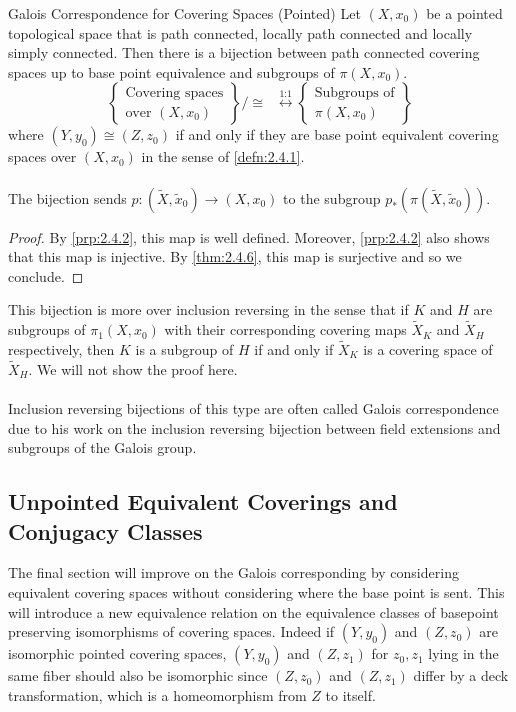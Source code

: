 \documentclass[a4paper]{article}
\begin{document}
\begin{thm}{Galois Correspondence for Covering Spaces (Pointed)}{} Let $(X,x_0)$ be a pointed topological space that is path connected, locally path connected and locally simply connected. Then there is a bijection between path connected covering spaces up to base point equivalence and subgroups of $\pi(X,x_0)$. $$\left\{\substack{\text{Covering spaces}\\\text{over }(X,x_0)}\right\}/\cong\;\;\overset{\text{1:1}}{\longleftrightarrow}\left\{\substack{\text{Subgroups of}\\ \pi(X,x_0)}\right\}$$ where $(Y,y_0)\cong(Z,z_0)$ if and only if they are base point equivalent covering spaces over $(X,x_0)$ in the sense of \ref{defn:2.4.1}. \\~\\

The bijection sends $p:(\tilde{X},\tilde{x}_0)\to(X,x_0)$ to the subgroup $p_\ast(\pi(\tilde{X},\tilde{x}_0))$. \tcbline
\begin{proof}
By \ref{prp:2.4.2}, this map is well defined. Moreover, \ref{prp:2.4.2} also shows that this map is injective. By \ref{thm:2.4.6}, this map is surjective and so we conclude. 
\end{proof}
\end{thm}

This bijection is more over inclusion reversing in the sense that if $K$ and $H$ are subgroups of $\pi_1(X,x_0)$ with their corresponding covering maps $\tilde{X}_K$ and $\tilde{X}_H$ respectively, then $K$ is a subgroup of $H$ if and only if $\tilde{X}_K$ is a covering space of $\tilde{X}_H$. We will not show the proof here. \\~\\

Inclusion reversing bijections of this type are often called Galois correspondence due to his work on the inclusion reversing bijection between field extensions and subgroups of the Galois group. 

\subsection{Unpointed Equivalent Coverings and Conjugacy Classes}
The final section will improve on the Galois corresponding by considering equivalent covering spaces without considering where the base point is sent. This will introduce a new equivalence relation on the equivalence classes of basepoint preserving isomorphisms of covering spaces. Indeed if $(Y,y_0)$ and $(Z,z_0)$ are isomorphic pointed covering spaces, $(Y,y_0)$ and $(Z,z_1)$ for $z_0,z_1$ lying in the same fiber should also be isomorphic since $(Z,z_0)$ and $(Z,z_1)$ differ by a deck transformation, which is a homeomorphism from $Z$ to itself. \\~\\
\end{document}
